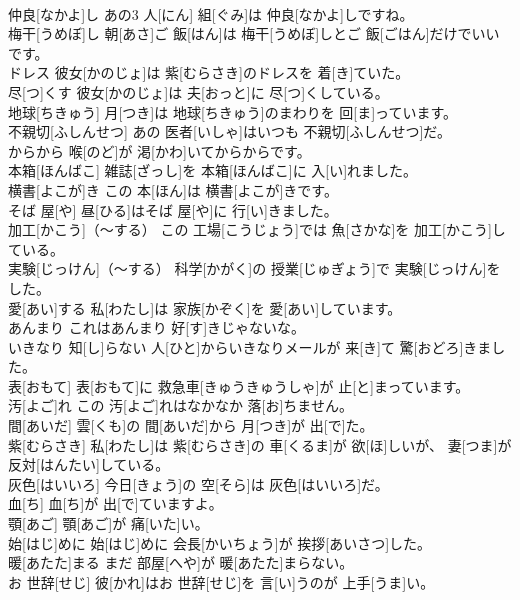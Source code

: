 \documentclass[8pt]{extreport}
\begin{document}
\begin{CJK}{UTF8}{min}
\\	仲良[なかよ]し	あの3 人[にん] 組[ぐみ]は 仲良[なかよ]しですね。		
\\	梅干[うめぼ]し	朝[あさ]ご 飯[はん]は 梅干[うめぼ]しとご 飯[ごはん]だけでいいです。		
\\	ドレス	彼女[かのじょ]は 紫[むらさき]のドレスを 着[き]ていた。		
\\	尽[つ]くす	彼女[かのじょ]は 夫[おっと]に 尽[つ]くしている。		
\\	地球[ちきゅう]	月[つき]は 地球[ちきゅう]のまわりを 回[ま]っています。		
\\	不親切[ふしんせつ]	あの 医者[いしゃ]はいつも 不親切[ふしんせつ]だ。		
\\	からから	喉[のど]が 渇[かわ]いてからからです。		
\\	本箱[ほんばこ]	雑誌[ざっし]を 本箱[ほんばこ]に 入[い]れました。		
\\	横書[よこが]き	この 本[ほん]は 横書[よこが]きです。		
\\	そば 屋[や]	昼[ひる]はそば 屋[や]に 行[い]きました。		
\\	加工[かこう]（～する）	この 工場[こうじょう]では 魚[さかな]を 加工[かこう]している。		
\\	実験[じっけん]（～する）	科学[かがく]の 授業[じゅぎょう]で 実験[じっけん]をした。		
\\	愛[あい]する	私[わたし]は 家族[かぞく]を 愛[あい]しています。		
\\	あんまり	これはあんまり 好[す]きじゃないな。		
\\	いきなり	知[し]らない 人[ひと]からいきなりメールが 来[き]て 驚[おどろ]きました。		
\\	表[おもて]	表[おもて]に 救急車[きゅうきゅうしゃ]が 止[と]まっています。		
\\	汚[よご]れ	この 汚[よご]れはなかなか 落[お]ちません。		
\\	間[あいだ]	雲[くも]の 間[あいだ]から 月[つき]が 出[で]た。		
\\	紫[むらさき]	私[わたし]は 紫[むらさき]の 車[くるま]が 欲[ほ]しいが、 妻[つま]が 反対[はんたい]している。		
\\	灰色[はいいろ]	今日[きょう]の 空[そら]は 灰色[はいいろ]だ。		
\\	血[ち]	血[ち]が 出[で]ていますよ。		
\\	顎[あご]	顎[あご]が 痛[いた]い。		
\\	始[はじ]めに	始[はじ]めに 会長[かいちょう]が 挨拶[あいさつ]した。		
\\	暖[あたた]まる	まだ 部屋[へや]が 暖[あたた]まらない。		
\\	お 世辞[せじ]	彼[かれ]はお 世辞[せじ]を 言[い]うのが 上手[うま]い。		

\end{CJK}
\end{document}

